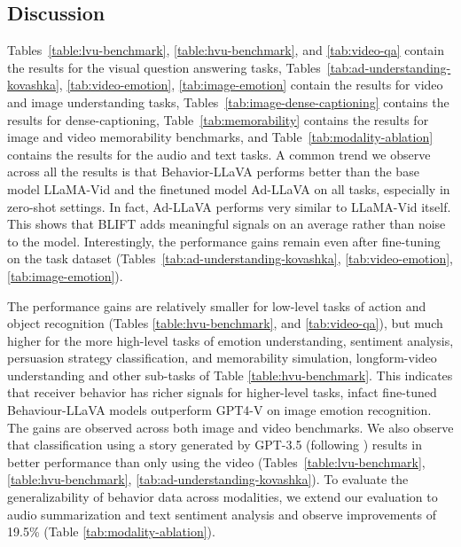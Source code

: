 \subsection{Discussion}
Tables~\ref{table:lvu-benchmark}, \ref{table:hvu-benchmark}, and \ref{tab:video-qa} contain the results for the visual question answering tasks, Tables~\ref{tab:ad-understanding-kovashka}, \ref{tab:video-emotion}, \ref{tab:image-emotion} contain the results for video and image understanding tasks, Tables~\ref{tab:image-dense-captioning} contains the results for dense-captioning, Table~\ref{tab:memorability} contains the results for image and video memorability benchmarks, and Table~\ref{tab:modality-ablation} contains the results for the audio and text tasks. A common trend we observe across all the results is that Behavior-LLaVA performs better than the base model LLaMA-Vid and the finetuned model Ad-LLaVA on all tasks, especially in zero-shot settings.  In fact, Ad-LLaVA performs very similar to LLaMA-Vid itself. This shows that BLIFT adds meaningful signals on an average rather than noise to the model. Interestingly, the performance gains remain even after fine-tuning on the task dataset (Tables~\ref{tab:ad-understanding-kovashka}, \ref{tab:video-emotion}, \ref{tab:image-emotion}). 

The performance gains are relatively smaller for low-level tasks of action and object recognition (Tables \ref{table:hvu-benchmark}, and \ref{tab:video-qa}), but much higher for the more high-level tasks of emotion understanding, sentiment analysis, persuasion strategy classification, and memorability simulation, longform-video understanding and other sub-tasks of Table \ref{table:hvu-benchmark}. This indicates that receiver behavior has richer signals for higher-level tasks, infact fine-tuned Behaviour-LLaVA models outperform GPT4-V on image emotion recognition. The gains are observed across both image and video benchmarks. We also observe that classification using a story generated by GPT-3.5 (following \citet{bhattacharya2023video}) results in better performance than only using the video (Tables~\ref{table:lvu-benchmark}, \ref{table:hvu-benchmark}, \ref{tab:ad-understanding-kovashka}). 
To evaluate the generalizability of behavior data across modalities, we extend our evaluation to audio summarization and text sentiment analysis and observe improvements of 19.5\% (Table \ref{tab:modality-ablation}). 




